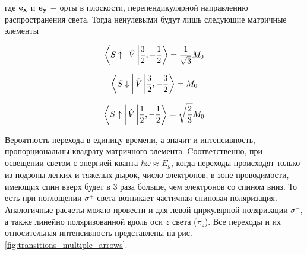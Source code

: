 \documentclass[14pt]{extarticle}
\numberwithin{equation}{section}
\begin{document}
где ${\bf e_x}$ и ${\bf e_y}$ $-$ орты в плоскости, перепендикулярной направлению распространения света.
Тогда ненулевыми будут лишь следующие матричные элементы

\begin{equation}
	\bra{S\uparrow  \vphantom{\frac{3}{2}} } \hat{V} \ket{\frac{3}{2}, -\frac{1}{2}} = \frac{1}{\sqrt{3}}M_0
	\end{equation}

\begin{equation}
	\bra{S\downarrow  \vphantom{\frac{3}{2}}} \hat{V} \ket{\frac{3}{2}, -\frac{3}{2}} = M_0
\end{equation}

\begin{equation}
	\bra{S\uparrow  \vphantom{\frac{3}{2}}} \hat{V} \ket{\frac{1}{2}, -\frac{1}{2}} = \sqrt{\frac{2}{3}}M_0
\end{equation}

Вероятность перехода в единицу времени, а значит и интенсивность, пропорциональны квадрату матричного элемента. Cоответственно, при освещении светом с энергией кванта $\hbar \omega \approx E_g$, когда переходы происходят только из подзоны легких и тяжелых дырок, число электронов, в зоне проводимости, имеющих спин вверх будет в 3 раза больше, чем  электронов со спином вниз. То есть при поглощении $\sigma^+$ света возникает частичная спиновая поляризация.  Аналогичные расчеты можно провести и для левой циркулярной поляризации $\sigma^-$, а также линейно поляризованной вдоль оси $z$ света ($\pi_z$). Все переходы и их относительная интенсивность представлены на рис. \ref{fig:transitions_multiple_arrows}.
\end{document}
